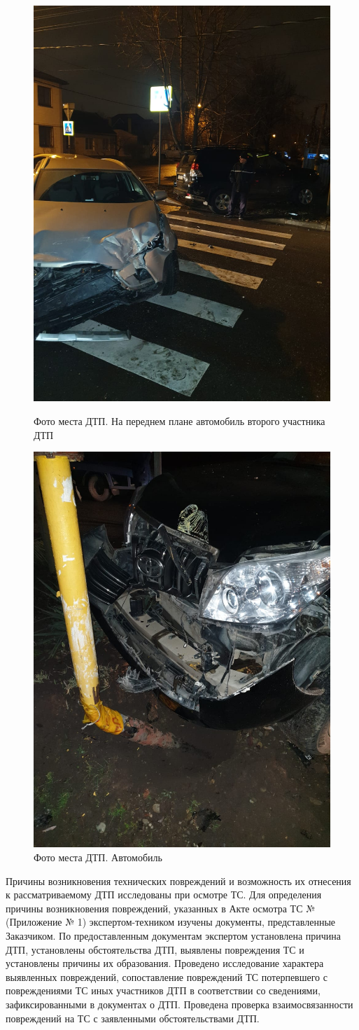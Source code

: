     \begin{figure}[!h]\centering
        \parbox[t]{0.49\textwidth}
        {\centering
            \includegraphics[width=.49\textwidth]{foto/дтп1}
            \caption{\footnotesize {Фото места ДТП. На переднем плане автомобиль второго участника ДТП}}
            \label{ris:images/дтп1}}
        \hfil \hfil%
        \parbox[t]{0.49\textwidth}
        {\centering
            \includegraphics[width=.49\textwidth]{foto/дтп2}
            \caption{\footnotesize {Фото места ДТП. Автомобиль }}
            \label{ris:images/дтп2}}
    \end{figure}
    
    Причины возникновения технических повреждений и возможность их отнесения к
рассматриваемому ДТП исследованы при осмотре ТС. Для определения причины возникновения повреждений, указанных в Акте осмотра ТС  №  \NomerDoc\, (Приложение № 1) экспертом-техником изучены документы, представленные Заказчиком. По предоставленным документам экспертом установлена причина ДТП, установлены обстоятельства ДТП, выявлены повреждения ТС и установлены причины их образования. Проведено исследование характера выявленных повреждений, сопоставление повреждений ТС потерпевшего с повреждениями ТС иных участников ДТП в соответствии со сведениями, зафиксированными в документах о ДТП.  Проведена проверка взаимосвязанности повреждений на ТС с заявленными обстоятельствами ДТП. 

